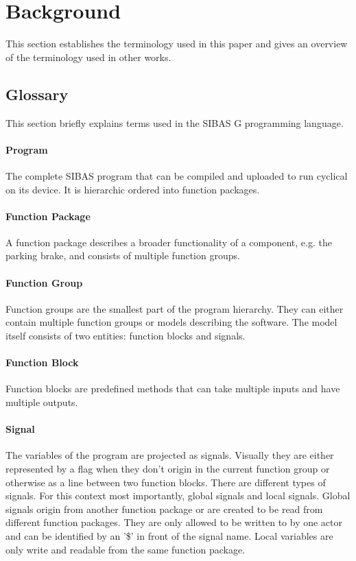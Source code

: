 \section{Background}\label{sec:vuln_background}

This section establishes the terminology used in this paper and gives an
overview of the terminology used in other works.

\subsection{Glossary}

This section briefly explains terms used in the SIBAS G programming language.

\paragraph{Program} The complete SIBAS program that can be compiled and uploaded to run cyclical on its device. It is hierarchic ordered into function packages.

\paragraph{Function Package} A function package describes a broader functionality of a component, e.g. the parking brake, and consists of multiple function groups.

\paragraph{Function Group} Function groups are the smallest part of the program hierarchy. They can either contain multiple function groups or models describing the software. The model itself consists of two entities: function blocks and signals.

\paragraph{Function Block} Function blocks are predefined methods that can take multiple inputs and have multiple outputs.

\paragraph{Signal} The variables of the program are projected as signals. Visually they are either represented by a flag when they don't origin in the current function group or otherwise as a line between two function blocks. There are different types of signals. For this context most importantly, global signals and local signals. Global signals origin from another function package or are created to be read from different function packages. They are only allowed to be written to by one actor and can be identified by an '\$' in front of the signal name. Local variables are only write and readable from the same function package. 

